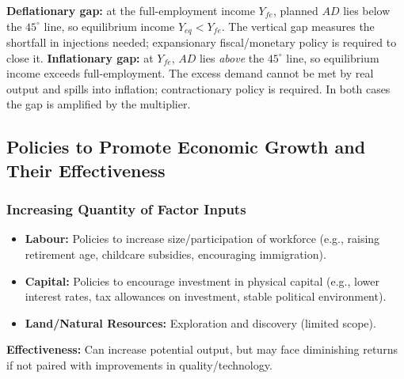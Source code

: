 \documentclass[11pt, a4paper, twoside]{book}
\begin{document}
\begin{diagrambox}
{
}{%
\textbf{\color{CurveNavy}Deflationary gap:} at the full-employment income $Y_{fe}$, planned $AD$ lies below the $45^\circ$ line, so equilibrium income $Y_{eq}<Y_{fe}$.  The vertical gap measures the shortfall in injections needed; expansionary fiscal/monetary policy is required to close it.\quad
\textbf{\color{CurveNavy}Inflationary gap:} at $Y_{fe}$, $AD$ lies \textit{above} the $45^\circ$ line, so equilibrium income exceeds full-employment.  The excess demand cannot be met by real output and spills into inflation; contractionary policy is required.  In both cases the gap is amplified by the multiplier.%
}
\end{diagrambox}

\subsection{Policies to Promote Economic Growth and Their Effectiveness}

\subsubsection{Increasing Quantity of Factor Inputs}

\begin{itemize}
  \item \textbf{Labour:} Policies to increase size/participation of workforce (e.g., raising retirement age, childcare subsidies, encouraging immigration).
  \item \textbf{Capital:} Policies to encourage investment in physical capital (e.g., lower interest rates, tax allowances on investment, stable political environment).
  \item \textbf{Land/Natural Resources:} Exploration and discovery (limited scope).
\end{itemize}
\textbf{Effectiveness:} Can increase potential output, but may face diminishing returns if not paired with improvements in quality/technology.
\end{document}
